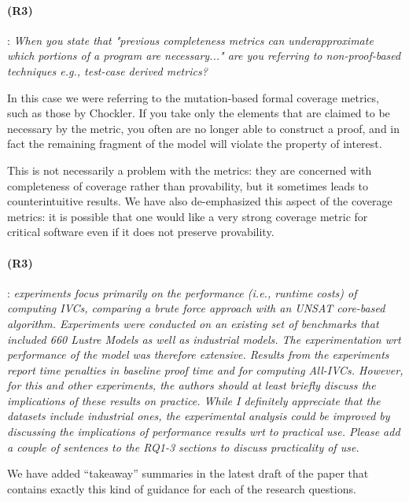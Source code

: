 \documentclass{article}
\begin{document}
\paragraph{(R3)}: \textit{When you state that "previous completeness metrics can underapproximate which portions of a program are necessary..." are you referring to non-proof-based techniques e.g., test-case derived metrics?}
\vspace{0.05in}

In this case we were referring to the mutation-based formal coverage metrics, such as those by Chockler.  If you take only the elements that are claimed to be necessary by the metric, you often are no longer able to construct a proof, and in fact the remaining fragment of the model will violate the property of interest.

This is not necessarily a problem with the metrics: they are concerned with completeness of coverage rather than provability, but it sometimes leads to counterintuitive results.  We have also de-emphasized this aspect of the coverage metrics: it is possible that one would like a very strong coverage metric for critical software even if it does not preserve provability.

\paragraph{(R3)}: \textit{experiments focus primarily on the performance (i.e., runtime costs) of computing IVCs, comparing a brute force approach with an UNSAT core-based algorithm. Experiments were conducted on an existing set of benchmarks that included 660 Lustre Models as well as industrial models. The experimentation wrt performance of the model was therefore extensive. Results from the experiments report time penalties in baseline proof time and for computing All-IVCs. However, for this and other experiments, the authors should at least briefly discuss the implications of these results on practice. While I definitely appreciate that the datasets include industrial ones, the experimental analysis could be improved by discussing the implications of performance results wrt to practical use. Please add a couple of sentences to the RQ1-3 sections to discuss practicality of use.}
\vspace{0.05in}

We have added ``takeaway'' summaries in the latest draft of the paper that contains exactly this kind of guidance for each of the research questions.
\end{document}
